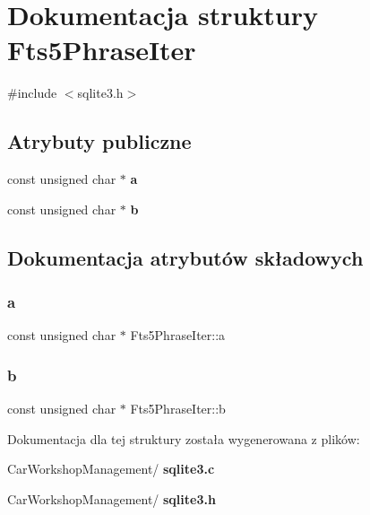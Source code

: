 \section{Dokumentacja struktury Fts5\+Phrase\+Iter}
\label{struct_fts5_phrase_iter}


{\ttfamily \#include $<$sqlite3.\+h$>$}

\subsection*{Atrybuty publiczne}
\begin{DoxyCompactItemize}
\item 
const unsigned char $\ast$ \textbf{ a}
\item 
const unsigned char $\ast$ \textbf{ b}
\end{DoxyCompactItemize}


\subsection{Dokumentacja atrybutów składowych}
\mbox{\label{struct_fts5_phrase_iter_ae7989e86f7246b1edf3f090867ae0604}} 
\subsubsection{a}
{\footnotesize\ttfamily const unsigned char $\ast$ Fts5\+Phrase\+Iter\+::a}

\mbox{\label{struct_fts5_phrase_iter_ac783edf6256522bd2a48a35bee957327}} 
\subsubsection{b}
{\footnotesize\ttfamily const unsigned char $\ast$ Fts5\+Phrase\+Iter\+::b}



Dokumentacja dla tej struktury została wygenerowana z plików\+:\begin{DoxyCompactItemize}
\item 
Car\+Workshop\+Management/\textbf{ sqlite3.\+c}\item 
Car\+Workshop\+Management/\textbf{ sqlite3.\+h}\end{DoxyCompactItemize}
